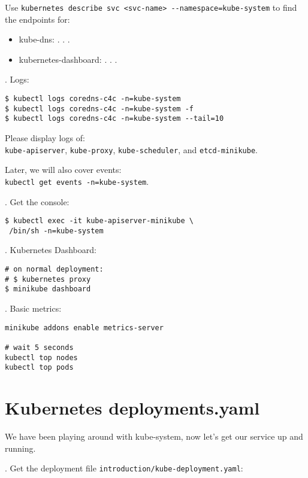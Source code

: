 \documentclass[12pt, letterpaper]{article}
\begin{document}
Use \verb|kubernetes describe svc <svc-name> --namespace=kube-system| to find the endpoints for:
\begin{itemize}
\item kube-dns: . . .
\item kubernetes-dashboard: . . .
\end{itemize}

. Logs:

\begin{verbatim}
$ kubectl logs coredns-c4c -n=kube-system
$ kubectl logs coredns-c4c -n=kube-system -f
$ kubectl logs coredns-c4c -n=kube-system --tail=10
\end{verbatim}

Please display logs of:\\
\verb|kube-apiserver|, \verb|kube-proxy|, \verb|kube-scheduler|, and \verb|etcd-minikube|.


Later, we will also cover events:\\
\texttt{kubectl get events -n=kube-system}.

. Get the console:

\begin{verbatim}
$ kubectl exec -it kube-apiserver-minikube \
 /bin/sh -n=kube-system
\end{verbatim}

. Kubernetes Dashboard:

\begin{verbatim}
# on normal deployment:
# $ kubernetes proxy
$ minikube dashboard
\end{verbatim}

. Basic metrics:

\begin{verbatim}
minikube addons enable metrics-server

# wait 5 seconds
kubectl top nodes
kubectl top pods
\end{verbatim}

%
%
%
\pagebreak
\section{Kubernetes deployments.yaml}

We have been playing around with kube-system, now let's get our service up and running.

. Get the deployment file \texttt{introduction/kube-deployment.yaml}:

\inputminted{yaml}{introduction/kube-deployment.yaml}
\end{document}
